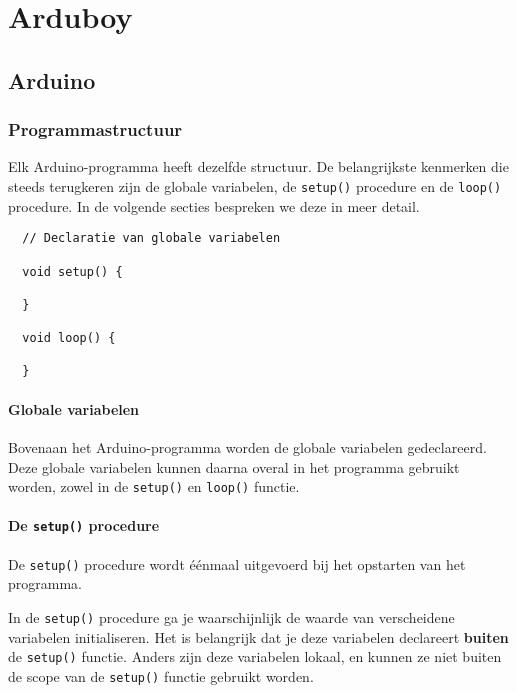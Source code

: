 \documentclass[11pt,fleqn]{book} %
\begin{document}
\part{Arduboy}

\chapter{Arduino}
\section{Programmastructuur}
Elk Arduino-programma heeft dezelfde structuur. De belangrijkste kenmerken die steeds terugkeren zijn de globale variabelen, de \texttt{setup()} procedure en de \texttt{loop()} procedure. In de volgende secties bespreken we deze in meer detail.

\begin{definition}
	\phantom{}
	\begin{verbatim}
  // Declaratie van globale variabelen
  
  void setup() {
    
  }
  
  void loop() {
  
  }
	\end{verbatim}
	\vspace{0cm}
\end{definition}

\subsection{Globale variabelen}
Bovenaan het Arduino-programma worden de globale variabelen gedeclareerd. Deze globale variabelen kunnen daarna overal in het programma gebruikt worden, zowel in de \texttt{setup()} en \texttt{loop()} functie.

\subsection{De \texttt{setup()} procedure}
De \texttt{setup()} procedure wordt éénmaal uitgevoerd bij het opstarten van het programma.

\begin{remark}
	In de \texttt{setup()} procedure ga je waarschijnlijk de waarde van verscheidene variabelen initialiseren. Het is belangrijk dat je deze variabelen declareert \textbf{buiten} de \texttt{setup()} functie. Anders zijn deze variabelen lokaal, en kunnen ze niet buiten de scope van de \texttt{setup()} functie gebruikt worden.
\end{remark}
\end{document}
